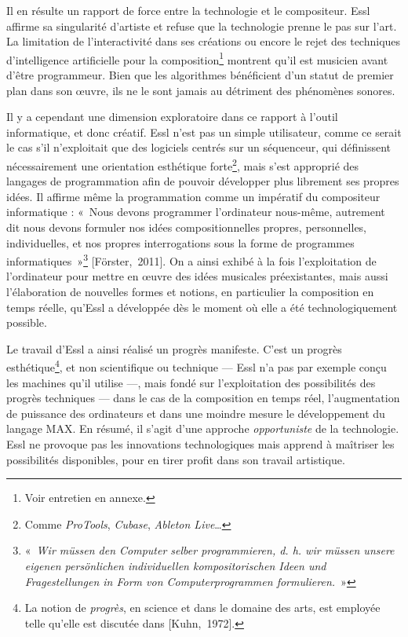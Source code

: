 \documentclass[a4paper,12pt]{article}
\newcommand{\guill}[1]{«~#1~»}
\newcommand{\cicite}[1]{{\footnotesize[#1]}}
\begin{document}
Il en résulte un rapport de force entre la technologie et le compositeur. Essl affirme sa singularité d'artiste et refuse que la technologie prenne le pas sur l'art. La limitation de l'interactivité dans ses créations ou encore le rejet des techniques d'intelligence artificielle pour la composition\footnote{Voir entretien en annexe.} montrent qu'il est musicien avant d'être programmeur. Bien que les algorithmes bénéficient d'un statut de premier plan dans son œuvre, ils ne le sont jamais au détriment des phénomènes sonores.

Il y a cependant une dimension exploratoire dans ce rapport à l'outil informatique, et donc créatif. Essl n'est pas un simple utilisateur, comme ce serait le cas s'il n'exploitait que des logiciels centrés sur un séquenceur, qui définissent nécessairement une orientation esthétique forte\footnote{Comme \emph{ProTools}, \emph{Cubase}, \emph{Ableton Live}\dots}, mais s'est approprié des langages de programmation afin de pouvoir développer plus librement ses propres idées. Il affirme même la programmation comme un impératif du compositeur informatique : \guill{Nous devons programmer l'ordinateur nous-même, autrement dit nous devons formuler nos idées compositionnelles propres, personnelles, individuelles, et nos propres interrogations sous la forme de programmes informatiques}\footnote{\guill{\emph{Wir müssen den Computer selber programmieren, d. h. wir müssen unsere eigenen persönlichen individuellen kompositorischen Ideen und Fragestellungen in Form von Computerprogrammen formulieren.}}} \cicite{Förster,~2011}. On a ainsi exhibé à la fois l'exploitation de l'ordinateur pour mettre en œuvre des idées musicales préexistantes, mais aussi l'élaboration de nouvelles formes et notions, en particulier la composition en temps réelle, qu'Essl a développée dès le moment où elle a été technologiquement possible.

Le travail d'Essl a ainsi réalisé un progrès manifeste. C'est un progrès esthétique\footnote{La notion de \emph{progrès}, en science et dans le domaine des arts, est employée telle qu'elle est discutée dans \cicite{Kuhn,~1972}.}, et non scientifique ou technique --- Essl n'a pas par exemple conçu les machines qu'il utilise ---, mais fondé sur l'exploitation des possibilités des progrès techniques --- dans le cas de la composition en temps réel, l'augmentation de puissance des ordinateurs et dans une moindre mesure le développement du langage MAX. En résumé, il s'agit d'une approche \emph{opportuniste} de la technologie. Essl ne provoque pas les innovations technologiques mais apprend à maîtriser les possibilités disponibles, pour en tirer profit dans son travail artistique.
\end{document}
